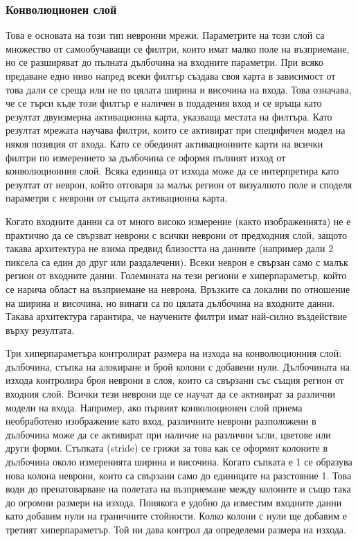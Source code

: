 \subsubsection{Конволюционен слой}
Това е основата на този тип невронни мрежи. Параметрите на този слой са множество от самообучаващи се филтри, които имат малко поле на възприемане, но се разширяват до пълната дълбочина на входните параметри. При всяко предаване едно ниво напред всеки филтър създава своя карта в зависимост от това дали се среща или не по цялата ширина и височина на входа. Това означава, че се търси къде този филтър е наличен в подадения вход и се връща като резултат двуизмерна активационна карта, указваща местата на филтъра. Като резултат мрежата научава филтри, които се активират при специфичен модел на някоя позиция от входа.
Като се обединят активационните карти на всички филтри по измерението за дълбочина се оформя пълният изход от конволюционния слой. Всяка единица от изхода може да се интерпретира като резултат от неврон, който отговаря за малък регион от визуалното поле и споделя параметри с неврони от същата активационна карта.

Когато входните данни са от много високо измерение (както изображенията) не е практично да се свързват неврони с всички неврони от предходния слой, защото такава архитектура не взима предвид близостта на данните (например дали 2 пиксела са един до друг или раздалечени). Всеки неврон е свързан само с малък регион от входните данни. Големината на тези региони е хиперпараметър, който се нарича област на възприемане на неврона. Връзките са локални по отношение на ширина и височина, но винаги са по цялата дълбочина на входните данни. Такава архитектура гарантира, че научените филтри имат най-силно въздействие върху резултата.  

Три хиперпараметъра контролират размера на изхода на конволюционния слой: дълбочина, стъпка на алокиране и брой колони с добавени нули.
Дълбочината на изхода контролира броя неврони в слоя, които са свързани със същия регион от входния слой. Всички тези неврони ще се научат да се активират за различни модели на входа. Например, ако първият конволюционен слой приема необработено изображение като вход, различните неврони разположени в дълбочина може да се активират при наличие на различни ъгли, цветове или други форми. Стъпката (stride) се грижи за това как се оформят колоните в дълбочина около измеренията ширина и височина. Когато съпката е 1 се образува нова колона неврони, които са свързани само до единиците на разстояние 1. Това води до пренатоварване на полетата на възприемане между колоните и също така до огромни размери на изхода. Понякога е удобно да изместим входните данни като добавим нули на граничните стойности. Колко колони с нули ще добавим е третият хиперпараметър. Той ни дава контрол да определеми размера на изхода. 

